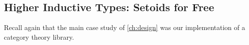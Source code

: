 \subsection{Higher Inductive Types: Setoids for Free}\label{sec:fixes:theory:HITs}\label{sec:HITs}
Recall again that the main case study of \autoref{ch:design} was our implementation of a category theory library.
$\left.\right.$
\begin{comment}
  \subsection{Equality} \label{sec:equality}
    Equality, which has recently become a very hot topic in type theory~\cite{HoTTBook} and higher category theory~\cite{Leinster2007}, provides another example of a design decision where most usage is independent of the exact implementation details.  Although the question of what it means for objects or morphisms to be equal does not come up much in classical 1-category theory, it is more important when formalizing category theory in a proof assistant, for reasons seemingly unrelated to its importance in higher category theory.  We consider some possible notions of equality.

    \subsubsection{Setoids}
      A setoid~\cite{bishop1967foundations} is a carrier type equipped with an equivalence relation; a map of setoids is a function between the carrier types and a proof that the function respects the equivalence relations of its domain and codomain.  Many authors \cite{copumpkin/categories,MathClasses,megacz-coq-categories,huet2000constructive%
      }
      choose to use a setoid of morphisms, which allows for the definition of the category of set(oid)s, as well as the category of (small) categories, without assuming functional extensionality, and allows for the definition of categories where the objects are quotient types.  However, there is significant overhead associated with using setoids everywhere, which can lead to slower compile times.  Every type that we talk about needs to come with a relation and a proof that this relation is an equivalence relation.  Every function that we use needs to come with a proof that it sends equivalent elements to equivalent elements.  Even worse, if we need an equivalence relation on the universe of ``types with equivalence relations,'' we need to provide a transport function between equivalent types that respects the equivalence relations of those types.


\end{comment}

